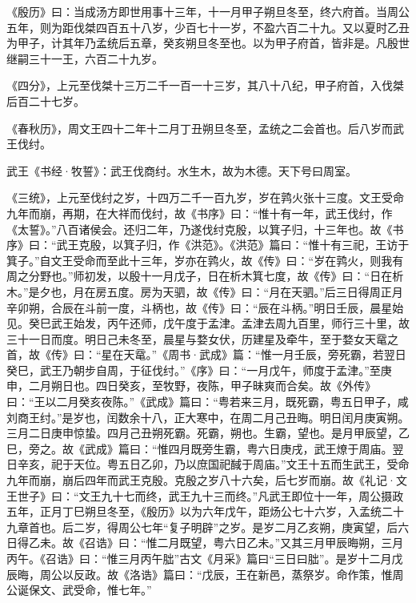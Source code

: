 \documentclass[12pt,UTF8]{ctexbook}
\begin{document}
《殷历》曰：当成汤方即世用事十三年，十一月甲子朔旦冬至，终六府首。当周公五年，则为距伐桀四百五十八岁，少百七十一岁，不盈六百二十九。又以夏时乙丑为甲子，计其年乃孟统后五章，癸亥朔旦冬至也。以为甲子府首，皆非是。凡殷世继嗣三十一王，六百二十九岁。



《四分》，上元至伐桀十三万二千一百一十三岁，其八十八纪，甲子府首，入伐桀后百二十七岁。



《春秋历》，周文王四十二年十二月丁丑朔旦冬至，孟统之二会首也。后八岁而武王伐纣。



武王《书经·牧誓》：武王伐商纣。水生木，故为木德。天下号曰周室。



《三统》，上元至伐纣之岁，十四万二千一百九岁，岁在鹑火张十三度。文王受命九年而崩，再期，在大祥而伐纣，故《书序》曰：“惟十有一年，武王伐纣，作《太誓》。”八百诸侯会。还归二年，乃遂伐纣克殷，以箕子归，十三年也。故《书序》曰：“武王克殷，以箕子归，作《洪范》。《洪范》篇曰：“惟十有三祀，王访于箕子。”自文王受命而至此十三年，岁亦在鹑火，故《传》曰：“岁在鹑火，则我有周之分野也。”师初发，以殷十一月戊子，日在析木箕七度，故《传》曰：“日在析木。”是夕也，月在房五度。房为天驷，故《传》曰：“月在天驷。”后三日得周正月辛卯朔，合辰在斗前一度，斗柄也，故《传》曰：“辰在斗柄。”明日壬辰，晨星始见。癸巳武王始发，丙午还师，戊午度于孟津。孟津去周九百里，师行三十里，故三十一日而度。明日己未冬至，晨星与婺女伏，历建星及牵牛，至于婺女天鼋之首，故《传》曰：“星在天鼋。”《周书·武成》篇：“惟一月壬辰，旁死霸，若翌日癸巳，武王乃朝步自周，于征伐纣。”《序》曰：“一月戊午，师度于孟津。”至庚申，二月朔日也。四日癸亥，至牧野，夜陈，甲子昧爽而合矣。故《外传》曰：“王以二月癸亥夜陈。”《武成》篇曰：“粤若来三月，既死霸，粤五日甲子，咸刘商王纣。”是岁也，闰数余十八，正大寒中，在周二月己丑晦。明日闰月庚寅朔。三月二日庚申惊蛰。四月己丑朔死霸。死霸，朔也。生霸，望也。是月甲辰望，乙巳，旁之。故《武成》篇曰：“惟四月既旁生霸，粤六日庚戌，武王燎于周庙。翌日辛亥，祀于天位。粤五日乙卯，乃以庶国祀馘于周庙。”文王十五而生武王，受命九年而崩，崩后四年而武王克殷。克殷之岁八十六矣，后七岁而崩。故《礼记·文王世子》曰：“文王九十七而终，武王九十三而终。”凡武王即位十一年，周公摄政五年，正月丁巳朔旦冬至，《殷历》以为六年戊午，距炀公七十六岁，入孟统二十九章首也。后二岁，得周公七年“复子明辟”之岁。是岁二月乙亥朔，庚寅望，后六日得乙未。故《召诰》曰：“惟二月既望，粤六日乙未。”又其三月甲辰晦朔，三月丙午。《召诰》曰：“惟三月丙午朏”古文《月采》篇曰“三日曰朏”。是岁十二月戊辰晦，周公以反政。故《洛诰》篇曰：“戊辰，王在新邑，蒸祭岁。命作策，惟周公诞保文、武受命，惟七年。”
\end{document}
